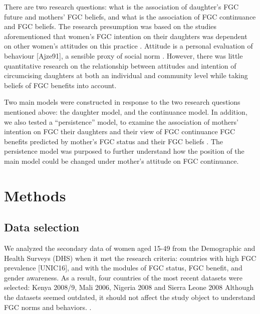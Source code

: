 \documentclass[
]{article}
\begin{document}
{{There are two research questions:  what is the association of daughter's FGC future and mothers' FGC beliefs, and what is the association of FGC continuance and FGC beliefs. The research presumption was based on the studies aforementioned that women’s FGC intention on their daughters was dependent on other women’s attitudes on this practice .  Attitude is a personal evaluation of behaviour [Ajze91], a sensible proxy of social norm \cfonly {norm theory [Ajze91, Ajze02, Bicc10, BiccMari15, Mack96, Mack00, MackLeJe08, RimaLapi15, Youn11]\cfonly{cut cites}].  It is an important index used to evaluate fgc practices [CislHeis18, EffeVogt15, Harf06, ModrLiu13, PashPonn16, ShelHern06,]} .  However, there was little quantitative research on the relationship between attitudes and intention of circumcising daughters at both an individual and community level while taking beliefs of FGC benefits into account.

Two main models were constructed in response to the two research questions mentioned above:  the daughter model, and the continuance model.  In addition, we also tested a “persistence” model, to examine the association of mothers' intention on FGC their daughters and their view of FGC continuance FGC benefits predicted by mother's FGC status and their FGC beliefs .  The persistence model was purposed to further understand how the position of the main model could be changed under mother's attitude on FGC continuance.

\hypertarget{methods}{%
\section{Methods}\label{methods}}

\hypertarget{data-selection}{%
\subsection{Data selection}\label{data-selection}}


We analyzed the secondary data of women aged 15-49 from the Demographic and Health Surveys (DHS) when it met the research criteria:  countries with high FGC prevalence [UNIC16], and with the modules of FGC status, FGC benefit, and gender awareness. As a result, four countries of the most recent datasets were selected: Kenya 2008/9, Mali 2006, Nigeria 2008 and Sierra Leone 2008    Although the datasets seemed outdated, it should not affect the study object to understand FGC norms and behaviors.  .

}}
\end{document}
